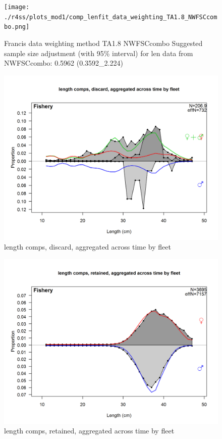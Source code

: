 \documentclass[12pt,]{article}
\begin{document}
\begin{figure}
\centering
\texttt{[image: ./r4ss/plots\_mod1/comp\_lenfit\_data\_weighting\_TA1.8\_NWFSCcombo.png]}
\caption{Francis data weighting method TA1.8 NWFSCcombo Suggested sample
size adjustment (with 95\% interval) for len data from NWFSCcombo:
0.5962 (0.3592\_2.224)
\label{fig:mod1_33_comp_lenfit_data_weighting_TA1.8_NWFSCcombo}}
\end{figure}

\begin{figure}
\centering
\includegraphics{./r4ss/plots_mod1/comp_lenfit_mkt1_aggregated_across_time.png}
\caption{length comps, discard, aggregated across time by fleet
\label{fig:mod1_34_comp_lenfit_mkt1_aggregated_across_time}}
\end{figure}

\begin{figure}
\centering
\includegraphics{./r4ss/plots_mod1/comp_lenfit_mkt2_aggregated_across_time.png}
\caption{length comps, retained, aggregated across time by fleet
\label{fig:mod1_35_comp_lenfit_mkt2_aggregated_across_time}}
\end{figure}
\end{document}
